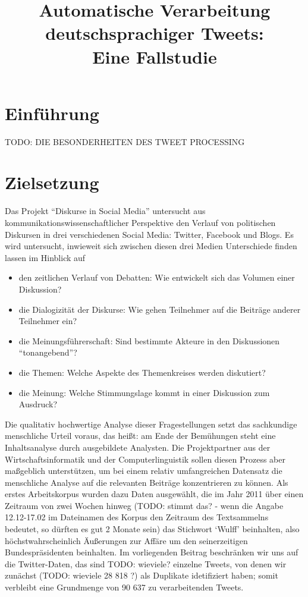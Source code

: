 \documentclass[11pt]{article}
\title{Automatische Verarbeitung deutschsprachiger Tweets:\\ Eine Fallstudie}
\author{}
\date{}
\begin{document}
\maketitle

\thispagestyle{empty}




\section{Einführung}

TODO: DIE BESONDERHEITEN DES TWEET PROCESSING


\section{Zielsetzung}

Das Projekt ``Diskurse in Social Media'' untersucht aus
kommunikationswissenschaftlicher Perspektive den Verlauf von
politischen Diskursen in drei verschiedenen Social Media: Twitter,
Facebook und Blogs. Es wird untersucht, inwieweit sich zwischen diesen
drei Medien Unterschiede finden lassen im Hinblick auf
\begin{itemize}
\item den zeitlichen Verlauf von Debatten: Wie entwickelt sich das
  Volumen einer Diskussion?
\item die Dialogizität der Diskurse: Wie gehen Teilnehmer auf die
  Beiträge anderer Teilnehmer ein?
\item die Meinungsführerschaft: Sind bestimmte Akteure in den
  Diskussionen ``tonangebend''?
\item die Themen: Welche Aspekte des Themenkreises werden diskutiert?
\item die Meinung: Welche Stimmungslage kommt in einer Diskussion zum Ausdruck?
\end{itemize}
Die qualitativ hochwertige Analyse dieser Fragestellungen setzt das
sachkundige menschliche Urteil voraus, das heißt: am Ende der
Bemühungen steht eine Inhaltsanalyse durch ausgebildete Analysten. Die
Projektpartner aus der Wirtschaftsinformatik und der
Computerlinguistik sollen diesen Prozess aber maßgeblich unterstützen,
um bei einem relativ umfangreichen Datensatz die menschliche Analyse
auf die relevanten Beiträge konzentrieren zu können. Als erstes
Arbeitskorpus wurden dazu Daten ausgewählt, die im Jahr 2011 über
einen Zeitraum von zwei Wochen hinweg (TODO: stimmt das? - wenn die
Angabe 12.12-17.02 im Dateinamen des Korpus den Zeitraum des
Textsammelns bedeutet, so d\"urften es gut 2 Monate sein) das
Stichwort `Wulff' beinhalten, also höchstwahrscheinlich Äußerungen zur
Affäre um den seinerzeitigen Bundespräsidenten beinhalten. Im
vorliegenden Beitrag beschränken wir uns auf die Twitter-Daten, das
sind TODO: wieviele? einzelne Tweets, von denen wir zunächst (TODO:
wieviele 28 818 ?) als Duplikate idetifiziert haben; somit verbleibt eine
Grundmenge von 90 637 zu verarbeitenden Tweets.
\end{document}
